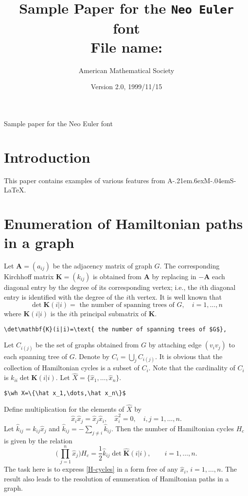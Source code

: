 \documentclass{article}
\title{Sample Paper for the \texttt{Neo Euler} font\\
File name: \fn{testmath.tex}}
\author{American Mathematical Society}
\date{Version 2.0, 1999/11/15}
\renewcommand{\AmS}{{\protect\AmSfont
  A\kern-.21em\lower.6ex\hbox{M}\kern-.04emS}}
\theoremstyle{definition}
\theoremstyle{remark}
\newcommand{\wh}{\widehat}
\begin{document}
\maketitle
{}
{Sample paper for the Neo Euler font}
\renewcommand{\sectionmark}[1]{}

\section{Introduction}

This paper contains examples of various features from \AmS-\LaTeX{}.

\section{Enumeration of Hamiltonian paths in a graph}

Let $\mathbf{A}=(a_{ij})$ be the adjacency matrix of graph $G$. The
corresponding Kirchhoff matrix $\mathbf{K}=(k_{ij})$ is obtained from
$\mathbf{A}$ by replacing in $-\mathbf{A}$ each diagonal entry by the
degree of its corresponding vertex; i.e., the $i$th diagonal entry is
identified with the degree of the $i$th vertex. It is well known that
\begin{equation}
\det\mathbf{K}(i|i)=\text{ the number of spanning trees of $G$},
\quad i=1,\dots,n
\end{equation}
where $\mathbf{K}(i|i)$ is the $i$th principal submatrix of
$\mathbf{K}$.
\begin{verbatim}
\det\mathbf{K}(i|i)=\text{ the number of spanning trees of $G$},
\end{verbatim}

Let $C_{i(j)}$ be the set of graphs obtained from $G$ by attaching edge
$(v_iv_j)$ to each spanning tree of $G$. Denote by $C_i=\bigcup_j
C_{i(j)}$. It is obvious that the collection of Hamiltonian cycles is a
subset of $C_i$. Note that the cardinality of $C_i$ is $k_{ii}\det
\mathbf{K}(i|i)$. Let $\wh X=\{\hat x_1,\dots,\hat x_n\}$.
\begin{verbatim}
$\wh X=\{\hat x_1,\dots,\hat x_n\}$
\end{verbatim}
Define multiplication for the elements of $\wh X$ by
\begin{equation}\label{multdef}
\hat x_i\hat x_j=\hat x_j\hat x_i,\quad \hat x^2_i=0,\quad
i,j=1,\dots,n.
\end{equation}
Let $\hat k_{ij}=k_{ij}\hat x_j$ and $\hat k_{ij}=-\sum_{j\not=i} \hat
k_{ij}$. Then the number of Hamiltonian cycles $H_c$ is given by the
relation \cite{liuchow:formalsum}
\begin{equation}\label{H-cycles}
\biggl(\prod^n_{\,j=1}\hat x_j\biggr)H_c=\frac{1}{2}\hat k_{ij}\det
\wh{\mathbf{K}}(i|i),\qquad i=1,\dots,n.
\end{equation}
The task here is to express \eqref{H-cycles}
in a form free of any $\hat x_i$,
$i=1,\dots,n$. The result also leads to the resolution of enumeration of
Hamiltonian paths in a graph.
\end{document}
